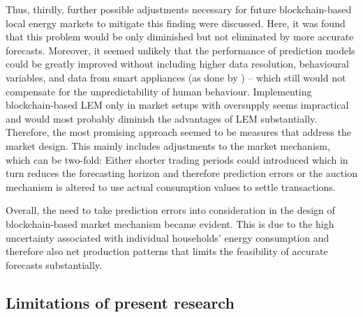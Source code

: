 Thus, thirdly, further possible adjustments necessary for future blockchain-based local energy markets to mitigate this finding were discussed. Here, it was found that this problem would be only diminished but not eliminated by more accurate forecasts. Moreover, it seemed unlikely that the performance of prediction models could be greatly improved without including higher data resolution, behavioural variables, and data from smart appliances (as done by \citet{Kong:2018}) -- which still would not compensate for the unpredictability of human behaviour. Implementing blockchain-based LEM only in market setups with oversupply seems impractical and would most probably diminish the advantages of LEM substantially. Therefore, the most promising approach seemed to be measures that address the market design. This mainly includes adjustments to the market mechanism, which can be two-fold: Either shorter trading periods could introduced which in turn reduces the forecasting horizon and therefore prediction errors or the auction mechanism is altered to use actual consumption values to settle transactions.

Overall, the need to take prediction errors into consideration in the design of blockchain-based market mechanism became evident. This is due to the high uncertainty associated with individual households' energy consumption and therefore also net production patterns that limits the feasibility of accurate forecasts substantially.




\subsection{Limitations of present research}\label{Sec:Conclusion;Subsec:Discussion}

